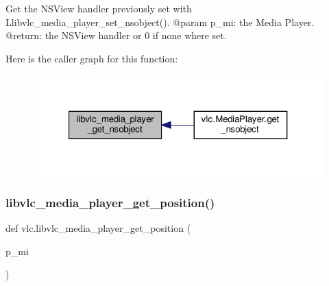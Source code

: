 \begin{DoxyVerb}Get the NSView handler previously set with L{libvlc_media_player_set_nsobject}().
@param p_mi: the Media Player.
@return: the NSView handler or 0 if none where set.
\end{DoxyVerb}
 Here is the caller graph for this function\+:
\nopagebreak
\begin{figure}[H]
\begin{center}
\leavevmode
\includegraphics[width=321pt]{namespacevlc_ac916d9f7b58a94ee7e081b110bb983fc_icgraph}
\end{center}
\end{figure}
\mbox{\label{namespacevlc_a1f0992a5cb5ad9dd56c91efbaa4c3804}} 
\subsubsection{\texorpdfstring{libvlc\+\_\+media\+\_\+player\+\_\+get\+\_\+position()}{libvlc\_media\_player\_get\_position()}}
{\footnotesize\ttfamily def vlc.\+libvlc\+\_\+media\+\_\+player\+\_\+get\+\_\+position (\begin{DoxyParamCaption}\item[{}]{p\+\_\+mi }\end{DoxyParamCaption})}

